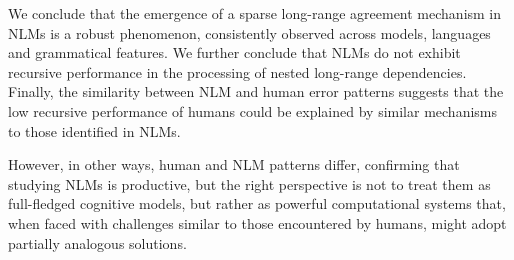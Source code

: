 We conclude that the emergence of a sparse long-range agreement mechanism in NLMs is a robust phenomenon, consistently observed across models, languages and grammatical features. We further conclude that NLMs do not exhibit recursive performance in the processing of nested long-range dependencies. Finally, the similarity between NLM and human error patterns suggests that the low recursive performance of humans could be explained by similar mechanisms to those identified in NLMs. 

 However, in other ways, human and NLM patterns differ, confirming that studying NLMs is productive, but the right perspective is not to treat them as full-fledged cognitive models, but rather as powerful computational systems that, when faced with challenges similar to those encountered by humans, might adopt partially analogous solutions.
